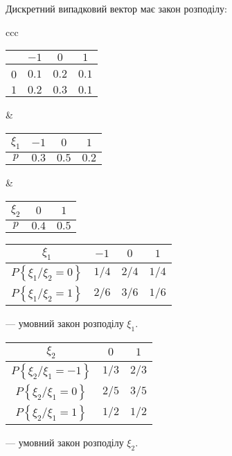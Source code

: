 \begin{example}
    Дискретний випадковий вектор має закон розподілу:

    \begin{tabular}{ccc}
        \begin{tabular}{|c|c|c|c|}
            \hline
            \diagbox{$\xi_2$}{$\xi_1$} & $-1$ & $0$ & $1$\\
            \hline
            0 & $0.1$ & $0.2$ & $0.1$ \\
            \hline
            $1$ & $0.2$ & $0.3$ & $0.1$ \\
            \hline
        \end{tabular}
        &
        \begin{tabular}{|c|c|c|c|}
            \hline
            $\xi_1$ & $-1$ & $0$ & $1$ \\
            \hline
            $p$ & $0.3$ & $0.5$ & $0.2$ \\
            \hline
        \end{tabular}
        &
        \begin{tabular}{|c|c|c|}
            \hline
            $\xi_2$ & $0$ & $1$ \\
            \hline
            $p$ & $0.4$ & $0.5$ \\
            \hline
        \end{tabular}
    \end{tabular}
\end{example}

\begin{tabular}{|c|c|c|c|}
    \hline
    $\xi_1$ & $-1$ & $0$ & $1$ \\
    \hline
    $P\left\{\xi_1 / \xi_2 = 0\right\}$ & $1/4$ 
    & $2/4$ & $1/4$ \\
    \hline
    $P\left\{\xi_1 / \xi_2 = 1\right\}$ & $2/6$ 
    & $3/6$ & $1/6$ \\
    \hline
\end{tabular}
--- умовний закон розподілу $\xi_1$.

\begin{tabular}{|c|c|c|}
    \hline
    $\xi_2$ & $0$ & $1$ \\
    \hline
    $P\left\{\xi_2 / \xi_1 = -1\right\}$ & $1/3$ 
    & $2/3$ \\
    \hline
    $P\left\{\xi_2 / \xi_1 = 0\right\}$ & $2/5$ 
    & $3/5$\\
    \hline
    $P\left\{\xi_2 / \xi_1 = 1\right\}$ & $1/2$ 
    & $1/2$\\
    \hline
\end{tabular}
--- умовний закон розподілу $\xi_2$.

